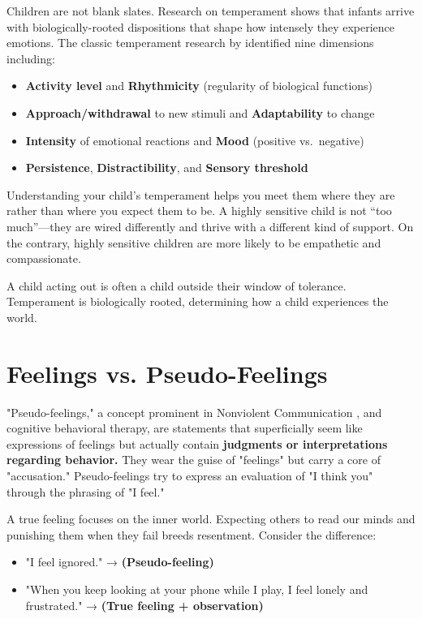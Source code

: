 Children are not blank slates. 
Research on temperament shows that infants arrive with biologically-rooted dispositions that shape how intensely they experience emotions. 
The classic temperament research by \citet{thomas1977} identified nine dimensions including:
\begin{itemize}
  \item \textbf{Activity level} and \textbf{Rhythmicity} (regularity of biological functions)
  \item \textbf{Approach/withdrawal} to new stimuli and \textbf{Adaptability} to change
  \item \textbf{Intensity} of emotional reactions and \textbf{Mood} (positive vs.\ negative)
  \item \textbf{Persistence}, \textbf{Distractibility}, and \textbf{Sensory threshold}
\end{itemize}
Understanding your child's temperament helps you meet them where they are rather than where you expect them to be. 
A highly sensitive child is not ``too much''---they are wired differently and thrive with a different kind of support.
On the contrary, highly sensitive children are more likely to be empathetic and compassionate.

\begin{keyinsight}
A child acting out is often a child outside their window of tolerance. Temperament is biologically rooted, determining how a child experiences the world.
\end{keyinsight}

\section{Feelings vs. Pseudo-Feelings}

"Pseudo-feelings," a concept prominent in Nonviolent Communication \citep{rosenberg2003}, and cognitive behavioral therapy, are statements that superficially seem like expressions of feelings but actually contain \textbf{judgments or interpretations regarding behavior.} 
They wear the guise of "feelings" but carry a core of "accusation." 
Pseudo-feelings try to express an evaluation of "I think you" through the phrasing of "I feel."

A true feeling focuses on the inner world. 
Expecting others to read our minds and punishing them when they fail breeds resentment. 
Consider the difference:
\begin{itemize}
    \item "I feel ignored." → \textbf{(Pseudo-feeling)}
    \item "When you keep looking at your phone while I play, I feel lonely and frustrated." → \textbf{(True feeling + observation)}
\end{itemize}

